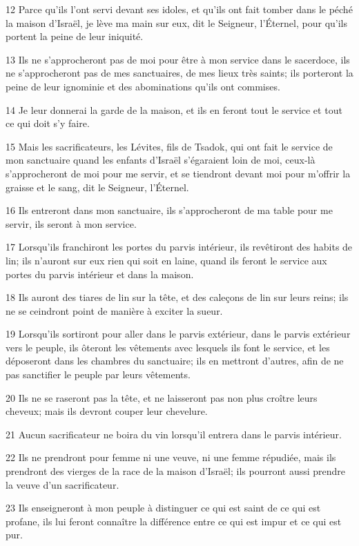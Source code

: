 \par 12 Parce qu'ils l'ont servi devant ses idoles, et qu'ils ont fait tomber dans le péché la maison d'Israël, je lève ma main sur eux, dit le Seigneur, l'Éternel, pour qu'ils portent la peine de leur iniquité.
\par 13 Ils ne s'approcheront pas de moi pour être à mon service dans le sacerdoce, ils ne s'approcheront pas de mes sanctuaires, de mes lieux très saints; ils porteront la peine de leur ignominie et des abominations qu'ils ont commises.
\par 14 Je leur donnerai la garde de la maison, et ils en feront tout le service et tout ce qui doit s'y faire.
\par 15 Mais les sacrificateurs, les Lévites, fils de Tsadok, qui ont fait le service de mon sanctuaire quand les enfants d'Israël s'égaraient loin de moi, ceux-là s'approcheront de moi pour me servir, et se tiendront devant moi pour m'offrir la graisse et le sang, dit le Seigneur, l'Éternel.
\par 16 Ils entreront dans mon sanctuaire, ils s'approcheront de ma table pour me servir, ils seront à mon service.
\par 17 Lorsqu'ils franchiront les portes du parvis intérieur, ils revêtiront des habits de lin; ils n'auront sur eux rien qui soit en laine, quand ils feront le service aux portes du parvis intérieur et dans la maison.
\par 18 Ils auront des tiares de lin sur la tête, et des caleçons de lin sur leurs reins; ils ne se ceindront point de manière à exciter la sueur.
\par 19 Lorsqu'ils sortiront pour aller dans le parvis extérieur, dans le parvis extérieur vers le peuple, ils ôteront les vêtements avec lesquels ils font le service, et les déposeront dans les chambres du sanctuaire; ils en mettront d'autres, afin de ne pas sanctifier le peuple par leurs vêtements.
\par 20 Ils ne se raseront pas la tête, et ne laisseront pas non plus croître leurs cheveux; mais ils devront couper leur chevelure.
\par 21 Aucun sacrificateur ne boira du vin lorsqu'il entrera dans le parvis intérieur.
\par 22 Ils ne prendront pour femme ni une veuve, ni une femme répudiée, mais ils prendront des vierges de la race de la maison d'Israël; ils pourront aussi prendre la veuve d'un sacrificateur.
\par 23 Ils enseigneront à mon peuple à distinguer ce qui est saint de ce qui est profane, ils lui feront connaître la différence entre ce qui est impur et ce qui est pur.
